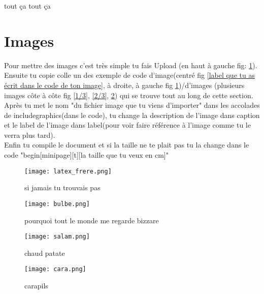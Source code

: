 \documentclass{report}
\begin{document}
tout ça tout ça

\section{Images}
Pour mettre des images c'est très simple tu fais Upload (en haut à gauche fig: \ref{un truc court qui te rappele ton image comme ça c'est pas trop dur d'y faire référence plusieur fois(le label ne sera pas écrit dans le document c'est juste pour toi)}).\\
Ensuite tu copie colle un des exemple de code d'image(centré fig \ref{label que tu as écrit dans le code de ton image}, à droite, à gauche fig \ref{un truc court qui te rappele ton image comme ça c'est pas trop dur d'y faire référence plusieur fois(le label ne sera pas écrit dans le document c'est juste pour toi)})/d'images (plusieurs images côte à côte fig \ref{1/3}, \ref{2/3}, \ref{3/3}) qui se trouve tout au long de cette section.\\
Après tu met le nom "du fichier image que tu viens d'importer" dans les accolades de includegraphics(dans le code), tu change la description de l'image dans caption et le label de l'image dans label(pour voir faire référence à l'image comme tu le verra plus tard).\\
Enfin tu compile le document et si la taille ne te plait pas tu la change dans le code "begin[minipage][t][la taille que tu veux en cm]"\\

\begin{figure}[!h]
    \begin{minipage}[t]{10cm}
        \centering
    \texttt{[image: latex\_frere.png]}
    \caption{si jamais tu trouvais pas}
    \label{un truc court qui te rappele ton image comme ça c'est pas trop dur d'y faire référence plusieur fois(le label ne sera pas écrit dans le document c'est juste pour toi)}
    \end{minipage}
\end{figure}

\begin{figure}[!h]
    \centering
    
    \begin{minipage}[t]{5cm}
        \centering
    \texttt{[image: bulbe.png]}
    \caption{pourquoi tout le monde me regarde bizzare}
    \label{1/3}
    \end{minipage}
    \begin{minipage}[t]{5cm}
        \centering
    \texttt{[image: salam.png]}
    \caption{chaud patate}
    \label{2/3}
    \end{minipage}
     \centering
    \begin{minipage}[t]{5cm}
        \centering
    \texttt{[image: cara.png]}
    \caption{carapils}
    \label{3/3}
    \end{minipage}
\end{figure}
\newpage
\end{document}
